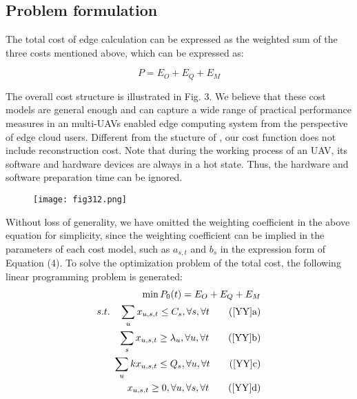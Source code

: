 \documentclass[journal,article,submit,pdftex,moreauthors]{Definitions/mdpi}
\begin{document}
\subsection{Problem formulation}
The total cost of edge calculation can be expressed as the weighted sum of the three costs mentioned above, which can be expressed as:

\begin{equation}
P=E_O+E_Q+E_M
\end{equation}

The overall cost structure is illustrated in Fig. 3. We believe that these cost models are general enough and can capture a wide range of practical performance measures in an multi-UAVs enabled edge computing system from the perspective of edge cloud users.  Different from the stucture of \cite{WANG}, our cost function does not include reconstruction cost. Note that during the working process of an UAV, its software and hardware devices are always in a hot state. Thus, the hardware and software preparation time can be ignored. 

\begin{figure}[H]
\centering
\texttt{[image: fig312.png]} 

 \centering
\fontsize{6.5}{8}
\end{figure}


Without loss of generality, we have omitted the weighting coefficient in the above equation for simplicity, since the weighting coefficient can be implied in the parameters of each cost model, such as $a_{s,t}$ and $b_s$ in the expression form of Equation (4).  To solve the optimization problem of the total cost, the following linear programming problem is generated:
\begin{align}
\min P_0(t)=E_O+E_Q+E_M  \label{YY}\\
s.t.\quad
\sum_ux_{u,s,t} \le C_s, \forall s,\forall t  \tag{\ref{YY}{a}} \label{YYa}\\
\sum_sx_{u,s,t} \ge \lambda_u, \forall u,\forall t \tag{\ref{YY}{b}} \label{YYb}\\
\sum_ukx_{u,s,t} \le Q_s, \forall u,\forall t \tag{\ref{YY}{c}} \label{YYc}\\
 x_{u,s,t} \ge 0, \forall u, \forall s ,\forall t \tag{\ref{YY}{d}} \label{YYd}
\end{align}
\end{document}
